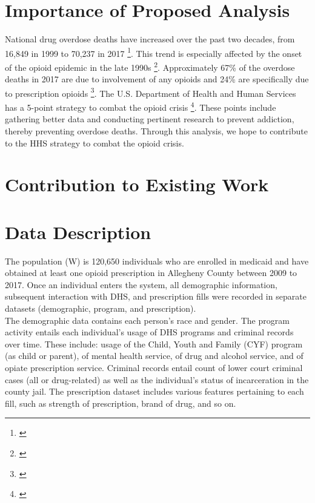 \documentclass[twoside,11pt]{article}
\begin{document}
\section{Importance of Proposed Analysis}
National drug overdose deaths have increased over the past two decades, from 16,849 in 1999 to 70,237 in 2017 \footnote{\cite{NIDA_ODR}}. This trend is especially affected by the onset of the opioid epidemic in the late 1990s \footnote{\cite{NIDA_OOC}}. Approximately 67\% of the overdose deaths in 2017 are due to involvement of any opioids and 24\% are specifically due to prescription opioids \footnote{\cite{NIDA_ODR}}. The U.S. Department of Health and Human Services has a 5-point strategy to combat the opioid crisis \footnote{\cite{HHS}}. These points include gathering better data and conducting pertinent research to prevent addiction, thereby preventing overdose deaths. Through this analysis, we hope to contribute to the HHS strategy to combat the opioid crisis. 

\section{Contribution to Existing Work}

\section{Data Description}
The population (W) is 120,650 individuals who are enrolled in medicaid and have obtained at least one opioid prescription in Allegheny County between 2009 to 2017. Once an individual enters the system, all demographic information, subsequent interaction with DHS, and prescription fills were recorded in separate datasets (demographic, program, and prescription). \\

The demographic data contains each person's race and gender. The program activity entails each individual's usage of DHS programs and criminal records over time. These include: usage of the Child, Youth and Family (CYF) program (as child or parent), of mental health service, of drug and alcohol service, and of opiate prescription service. Criminal records entail count of lower court criminal cases (all or drug-related) as well as the individual's status of incarceration in the county jail. The prescription dataset includes various features pertaining to each fill, such as strength of prescription, brand of drug, and so on. \\
\end{document}
